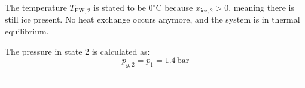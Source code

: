 The temperature \( T_{\text{EW},2} \) is stated to be \( 0^\circ\text{C} \) because \( x_{\text{ice},2} > 0 \), meaning there is still ice present. No heat exchange occurs anymore, and the system is in thermal equilibrium.  

The pressure in state 2 is calculated as:  
\[
p_{g,2} = p_1 = 1.4 \, \text{bar}
\]  

---